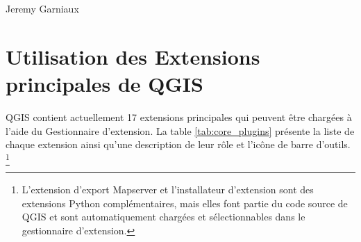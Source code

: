 \item [Traducteur :] Jeremy Garniaux

\section{Utilisation des Extensions principales de QGIS}\label{sec:core_plugins}



QGIS contient actuellement 17 extensions principales qui peuvent être chargées à l'aide du Gestionnaire d'extension.
La table \ref{tab:core_plugins} présente la liste de chaque extension ainsi qu'une 
description de leur rôle et l'icône de barre d'outils. \footnote{L'extension d'export 
Mapserver et l'installateur d'extension sont des extensions Python complémentaires, 
mais elles font partie du code source de QGIS et sont automatiquement chargées et sélectionnables 
dans le gestionnaire d'extension.}



